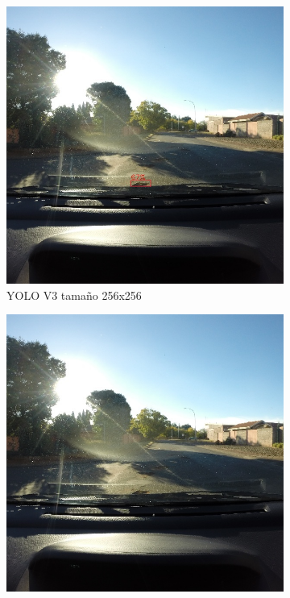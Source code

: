 \begin{figure}[H]
\begin{subfigure}[h]{0.45\linewidth}
		\includegraphics[width=\linewidth]{images/results_c_yolo_v3_256.jpg}
		\caption{YOLO V3 tamaño 256x256}
	\end{subfigure}
	\begin{subfigure}[h]{0.45\linewidth}
		\includegraphics[width=\linewidth]{images/results_c_yolo_v3_416.jpg}

\end{subfigure}
\end{figure}
